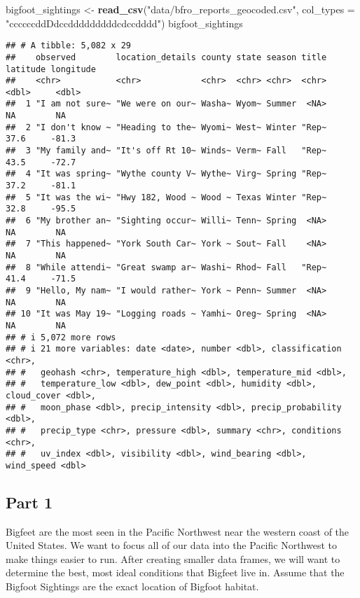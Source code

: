 \documentclass[
]{article}
\newenvironment{Shaded}{\begin{snugshade}}{\end{snugshade}}
\newcommand{\AttributeTok}[1]{\textcolor[rgb]{0.13,0.29,0.53}{#1}}
\newcommand{\FunctionTok}[1]{\textcolor[rgb]{0.13,0.29,0.53}{\textbf{#1}}}
\newcommand{\NormalTok}[1]{#1}
\newcommand{\OtherTok}[1]{\textcolor[rgb]{0.56,0.35,0.01}{#1}}
\newcommand{\StringTok}[1]{\textcolor[rgb]{0.31,0.60,0.02}{#1}}
\begin{document}
\begin{Shaded}
\begin{Highlighting}[]
\NormalTok{bigfoot\_sightings }\OtherTok{\textless{}{-}} \FunctionTok{read\_csv}\NormalTok{(}\StringTok{"data/bfro\_reports\_geocoded.csv"}\NormalTok{, }\AttributeTok{col\_types =} \StringTok{"ccccccddDdccdddddddddcdccdddd"}\NormalTok{)}
\NormalTok{bigfoot\_sightings}
\end{Highlighting}
\end{Shaded}

\begin{verbatim}
## # A tibble: 5,082 x 29
##    observed        location_details county state season title latitude longitude
##    <chr>           <chr>            <chr>  <chr> <chr>  <chr>    <dbl>     <dbl>
##  1 "I am not sure~ "We were on our~ Washa~ Wyom~ Summer  <NA>     NA        NA  
##  2 "I don't know ~ "Heading to the~ Wyomi~ West~ Winter "Rep~     37.6     -81.3
##  3 "My family and~ "It's off Rt 10~ Winds~ Verm~ Fall   "Rep~     43.5     -72.7
##  4 "It was spring~ "Wythe county V~ Wythe~ Virg~ Spring "Rep~     37.2     -81.1
##  5 "It was the wi~ "Hwy 182, Wood ~ Wood ~ Texas Winter "Rep~     32.8     -95.5
##  6 "My brother an~ "Sighting occur~ Willi~ Tenn~ Spring  <NA>     NA        NA  
##  7 "This happened~ "York South Car~ York ~ Sout~ Fall    <NA>     NA        NA  
##  8 "While attendi~ "Great swamp ar~ Washi~ Rhod~ Fall   "Rep~     41.4     -71.5
##  9 "Hello, My nam~ "I would rather~ York ~ Penn~ Summer  <NA>     NA        NA  
## 10 "It was May 19~ "Logging roads ~ Yamhi~ Oreg~ Spring  <NA>     NA        NA  
## # i 5,072 more rows
## # i 21 more variables: date <date>, number <dbl>, classification <chr>,
## #   geohash <chr>, temperature_high <dbl>, temperature_mid <dbl>,
## #   temperature_low <dbl>, dew_point <dbl>, humidity <dbl>, cloud_cover <dbl>,
## #   moon_phase <dbl>, precip_intensity <dbl>, precip_probability <dbl>,
## #   precip_type <chr>, pressure <dbl>, summary <chr>, conditions <chr>,
## #   uv_index <dbl>, visibility <dbl>, wind_bearing <dbl>, wind_speed <dbl>
\end{verbatim}

\hypertarget{part-1}{%
\subsection{Part 1}\label{part-1}}

Bigfeet are the most seen in the Pacific Northwest near the western
coast of the United States. We want to focus all of our data into the
Pacific Northwest to make things easier to run. After creating smaller
data frames, we will want to determine the best, most ideal conditions
that Bigfeet live in. Assume that the Bigfoot Sightings are the exact
location of Bigfoot habitat.
\end{document}
